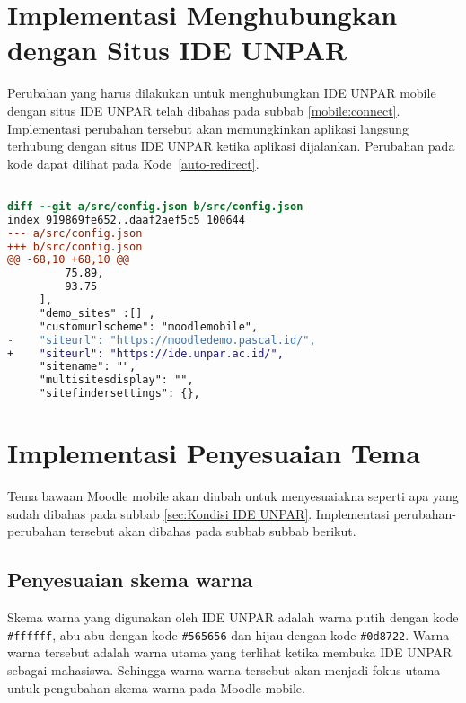 \section{Implementasi Menghubungkan dengan Situs IDE UNPAR}

Perubahan yang harus dilakukan untuk menghubungkan IDE UNPAR mobile dengan situs IDE UNPAR telah dibahas pada subbab \ref{mobile:connect}.  Implementasi perubahan tersebut akan memungkinkan aplikasi langsung terhubung dengan situs IDE UNPAR ketika aplikasi dijalankan. Perubahan pada kode dapat dilihat pada  \mbox{Kode \ref{auto-redirect}}. 


\begin{lstlisting}[language=diff, frame=single, label ={auto-redirect}, caption = Perubahan pada file \texttt{config.json} ]

diff --git a/src/config.json b/src/config.json
index 919869fe652..daaf2aef5c5 100644
--- a/src/config.json
+++ b/src/config.json
@@ -68,10 +68,10 @@
         75.89,
         93.75
     ],
     "demo_sites" :[] ,
     "customurlscheme": "moodlemobile",
-    "siteurl": "https://moodledemo.pascal.id/",
+    "siteurl": "https://ide.unpar.ac.id/",
     "sitename": "",
     "multisitesdisplay": "",
     "sitefindersettings": {},
\end{lstlisting} 
\section{Implementasi Penyesuaian Tema}
Tema bawaan Moodle mobile akan diubah untuk menyesuaiakna seperti apa yang sudah dibahas pada subbab \ref{sec:Kondisi IDE UNPAR}. Implementasi perubahan-perubahan tersebut akan dibahas pada subbab subbab berikut.

\subsection{Penyesuaian skema warna}
Skema warna yang digunakan oleh IDE UNPAR adalah warna putih dengan kode \texttt{\#ffffff}, abu-abu dengan kode \texttt{\#565656} dan hijau dengan kode \texttt{\#0d8722}.  Warna-warna tersebut adalah warna utama yang terlihat ketika membuka IDE UNPAR sebagai mahasiswa. Sehingga warna-warna tersebut akan menjadi fokus utama untuk pengubahan skema warna pada Moodle mobile.

